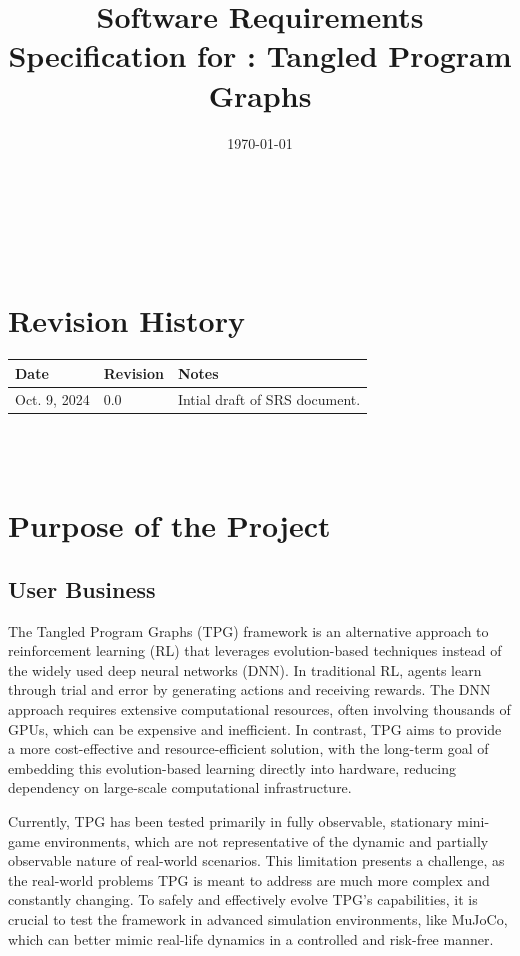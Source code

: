 \documentclass[12pt]{article}
\begin{document}
\title{Software Requirements Specification for \progname: Tangled Program Graphs} 
\author{\authname}
\date{\today}
	
\maketitle

~\newpage


\tableofcontents

~\newpage

\section*{Revision History}

\begin{tabularx}{\textwidth}{p{3cm}p{2cm}X}
\toprule {\textbf{Date}} & {\textbf{Revision}} & {\textbf{Notes}}\\
\midrule
Oct. 9, 2024 & 0.0 & Intial draft of SRS document.\\
\bottomrule
\end{tabularx}

~\\

~\newpage
\section{Purpose of the Project}
\subsection{User Business}
The Tangled Program Graphs (TPG) framework is an alternative approach to reinforcement learning (RL) that leverages evolution-based techniques instead of the widely used deep neural networks (DNN). In traditional RL, agents learn through trial and error by generating actions and receiving rewards. The DNN approach requires extensive computational resources, often involving thousands of GPUs, which can be expensive and inefficient. In contrast, TPG aims to provide a more cost-effective and resource-efficient solution, with the long-term goal of embedding this evolution-based learning directly into hardware, reducing dependency on large-scale computational infrastructure.

Currently, TPG has been tested primarily in fully observable, stationary mini-game environments, which are not representative of the dynamic and partially observable nature of real-world scenarios. This limitation presents a challenge, as the real-world problems TPG is meant to address are much more complex and constantly changing. To safely and effectively evolve TPG's capabilities, it is crucial to test the framework in advanced simulation environments, like MuJoCo, which can better mimic real-life dynamics in a controlled and risk-free manner.
\end{document}
